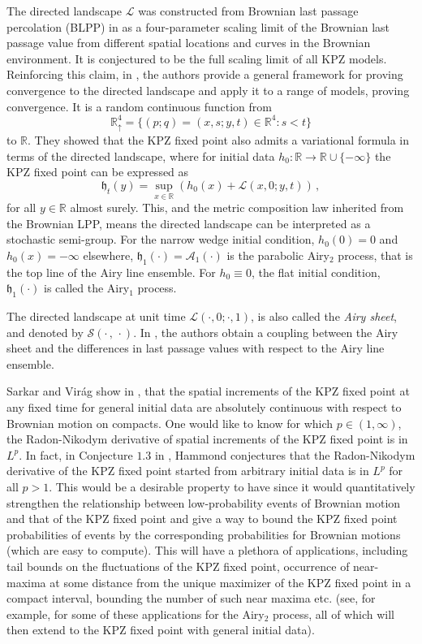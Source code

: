 \documentclass[11pt, reqno]{amsart}
\numberwithin{equation}{section}
\newcommand{\R}{\ensuremath{\mathbb{R}}}
\begin{document}
The directed landscape $\mathcal L $ was constructed from Brownian last passage percolation (BLPP) in \cite{DOV} as a four-parameter scaling limit of the Brownian last passage value from different spatial locations and curves in the Brownian environment. It is conjectured to be the full scaling limit of all KPZ models. Reinforcing this claim, in \cite{dauvergne2025characterizationdirectedlandscapekpz}, the authors provide a general framework for proving convergence to the directed landscape and apply it to a range of models, proving convergence. It is a random continuous function from $$
\R^4_\uparrow = \{(p; q) = (x, s; y, t) \in \R^4 : s < t\}
$$
to $\R$. They showed that the KPZ fixed point also admits a variational formula in terms of the directed landscape, where for initial data $h_0:\mathbb R \to \mathbb R\cup \{-\infty\}$ the KPZ fixed point can be expressed as
\begin{equation*}\mathfrak{h}_t(y) = \sup_{x\in \R} (h_0(x) + \mathcal{L}(x, 0; y, t))\,,\end{equation*}
for all $y\in \R$ almost surely. This, and the metric composition law inherited from the Brownian LPP, means the directed landscape can be interpreted as a stochastic semi-group. For the narrow wedge initial condition, $h_0(0)=0$ and $h_0(x)=-\infty$ elsewhere, $\mathfrak{h}_1(\cdot)=\mathcal{A}_1(\cdot)$ is the parabolic Airy$_2$ process, that is the top line of the Airy line ensemble. For $h_0\equiv 0$, the flat initial condition, $\mathfrak{h}_1(\cdot)$ is called the Airy$_1$ process. 

The directed landscape at unit time $\mathcal{L}(\cdot, 0; \cdot, 1)$, is also called the \emph{Airy sheet}, and denoted by $\mathcal{S}(\cdot\,, \,\cdot)$. In \cite{DOV}, the authors obtain a coupling between the Airy sheet and the differences in last passage values with respect to the Airy line ensemble. 

Sarkar and Vir\'ag show in \cite{sarkar2021brownian}, that the spatial increments of the KPZ fixed point at any fixed time for general initial data are absolutely continuous with respect to Brownian motion on compacts. One would like to know for which $p\in (1,\infty)$, the Radon-Nikodym derivative of spatial increments of the KPZ fixed point is in $L^p$. In fact, in Conjecture $1.3$ in \cite{hammond2019patchwork}, Hammond conjectures that the Radon-Nikodym derivative of the KPZ fixed point started from arbitrary initial data is in $L^p$ for all $p>1$. This would be a desirable property to have since it would quantitatively strengthen the relationship between low-probability events of Brownian motion and that of the KPZ fixed point and give a way to bound the KPZ fixed point probabilities of events by the corresponding probabilities for Brownian motions (which are easy to compute). This will have a plethora of applications, including tail bounds on the fluctuations of the KPZ fixed point, occurrence of near-maxima at some distance from the unique maximizer of the KPZ fixed point in a compact interval, bounding the number of such near maxima etc. (see, for example, \cite{hammond2019patchwork} for some of these applications for the Airy$_2$ process, all of which will then extend to the KPZ fixed point with general initial data). 
\end{document}

